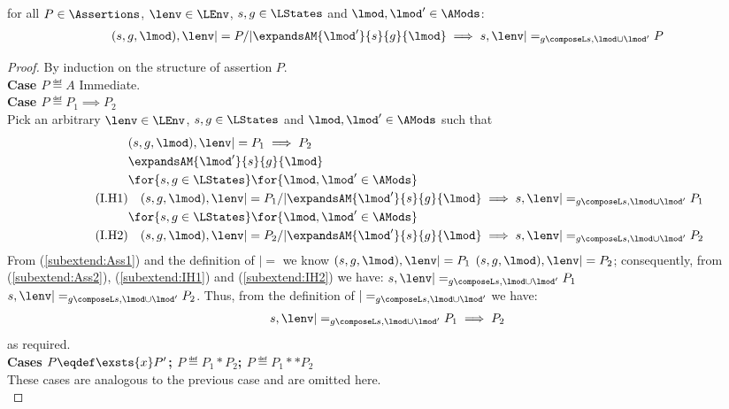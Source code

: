 %
%
\begin{lemma}[]\label{lem:extend1}
for all $P \in \Assertions$, $\lenv \in \LEnv$, $s, g \in \LStates$ and $\lmod, \lmod' \in \AMods$: 
% 
\[
\begin{array}{@{} l @{}}
	(s, g, \lmod), \lenv |= P /| \expandsAM{\lmod'}{s}{g}{\lmod}
	\implies  s, \lenv |=_{g \composeL s, \lmod \cup \lmod'} P
\end{array}
\]
%
\begin{proof}
By induction on the structure of assertion $P$.	\\

\noindent\textbf{Case $P \eqdef A$\quad} Immediate.\\
\noindent\textbf{Case $P \eqdef P_1 \implies P_2$} \\
Pick an arbitrary $\lenv \in \LEnv$, $s, g \in \LStates$ and $\lmod, \lmod' \in \AMods$ such that
%
\begin{align}
	& (s, g, \lmod), \lenv |= P_1 \implies P_2 \label{subextend:Ass1}\\
%	
	& \expandsAM{\lmod'}{s}{g}{\lmod} \label{subextend:Ass2}\\
%	
	& \for{s, g \in \LStates} \for{\lmod, \lmod' \in \AMods} \nonumber\\
	\tag{I.H1} & \quad (s, g, \lmod), \lenv |= P_1 /| \expandsAM{\lmod'}{s}{g}{\lmod}
	\implies s, \lenv |=_{g \composeL s, \lmod \cup \lmod'} P_1
	\label{subextend:IH1}\\ 
%
	& \for{s, g \in \LStates} \for{\lmod, \lmod' \in \AMods} \nonumber\\
	\tag{I.H2} & \quad (s, g, \lmod), \lenv |= P_2 /| \expandsAM{\lmod'}{s}{g}{\lmod}
	\implies s, \lenv |=_{g \composeL s, \lmod \cup \lmod'} P_2
	\label{subextend:IH2}
%	
\end{align}
%
From (\ref{subextend:Ass1}) and the definition of $|=$ we know $(s, g, \lmod), \lenv |= P_1$  $(s, g, \lmod), \lenv |= P_2$; consequently, from (\ref{subextend:Ass2}), (\ref{subextend:IH1}) and (\ref{subextend:IH2}) we have: $s, \lenv |=_{g \composeL s, \lmod \cup \lmod'} P_1$  $s, \lenv |=_{g \composeL s, \lmod \cup \lmod'} P_2$. Thus, from the definition of $|=_{g \composeL s, \lmod \cup \lmod'}$ we have:
%
\begin{align*}
	s, \lenv |=_{g \composeL s, \lmod \cup \lmod'} P_1 \implies P_2
\end{align*}
%
as required.\\

\noindent\textbf{Cases $P \eqdef \exsts{x} P'$; $P \eqdef P_1 * P_2$; $P \eqdef P_1 ** P_2$} \\
These cases are analogous to the previous case and are omitted here. \\


\end{proof}
\end{lemma}

